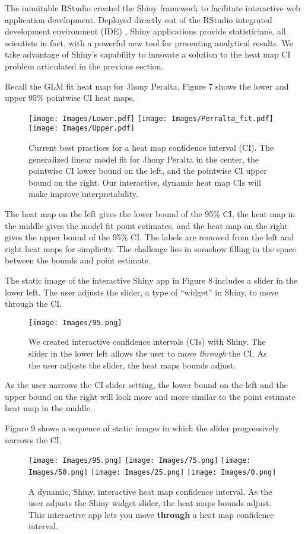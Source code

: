 \documentclass{article}
\begin{document}
The inimitable RStudio created the Shiny framework to facilitate interactive web application development. Deployed directly out of the RStudio integrated development environment (IDE) \citep{IDE}, Shiny applications provide statisticians, all scientists in fact, with a powerful new tool for presenting analytical results. We take advantage of Shiny's capability to innovate a solution to the heat map CI problem articulated in the previous section.

Recall the GLM fit heat map for Jhony Peralta. Figure 7 shows the lower and upper 95\% pointwise CI heat maps.

  \begin{figure}[H]
	\centering
	\texttt{[image: Images/Lower.pdf]}
	\texttt{[image: Images/Perralta\_fit.pdf]}
	\texttt{[image: Images/Upper.pdf]}
	\caption{Current best practices for a heat map confidence interval (CI). The generalized linear model fit for Jhony Peralta in the center, the pointwise CI lower bound on the left, and the pointwise CI upper bound on the right. Our interactive, dynamic heat map CIs will make improve interpretability.} 
	\end{figure}
The heat map on the left gives the lower bound of the 95\% CI, the heat map in the middle gives the model fit point estimates, and the heat map on the right gives the upper bound of the 95\% CI. The labels are removed from the left and right heat maps for simplicity. The challenge lies in somehow filling in the space between the bounds and point estimate.

The static image of the interactive Shiny app in Figure 8 includes a slider in the lower left. The user adjusts the slider, a type of ``widget'' in Shiny, to move through the CI. 

  \begin{figure}[H]
	\centering
	\texttt{[image: Images/95.png]}
	\caption{We created interactive confidence intervals (CIs) with Shiny. The slider in the lower left allows the user to move {\it through} the CI. As the user adjusts the slider, the heat maps bounds adjust.} 
	\end{figure}

As the user narrows the CI slider setting, the lower bound on the left and the upper bound on the right will look more and more similar to the point estimate heat map in the middle.

Figure 9 shows a sequence of static images in which the slider progressively narrows the CI.
  \begin{figure}[H]
	\centering
	\texttt{[image: Images/95.png]}
	\texttt{[image: Images/75.png]}
	\texttt{[image: Images/50.png]}
	\texttt{[image: Images/25.png]}
	\texttt{[image: Images/0.png]}
	\caption{A dynamic, Shiny, interactive heat map confidence interval. As the user adjusts the Shiny widget slider, the heat maps bounds adjust. This interactive app lets you move {\bf through} a heat map confidence interval.} 
	\end{figure}
	
\end{document}
